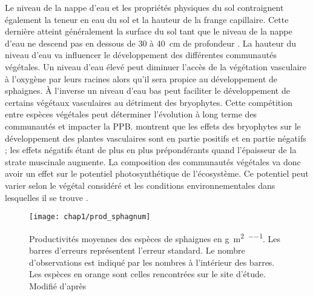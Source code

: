 Le niveau de la nappe d'eau et les propriétés physiques du sol contraignent également la teneur en eau du sol et la hauteur de la frange capillaire.
Cette dernière atteint généralement la surface du sol tant que le niveau de la nappe d'eau ne descend pas en dessous de \num{30} à \SI{40}{\centi\metre} de profondeur \citep{laiho2006}.
La hauteur du niveau d'eau va influencer le développement des différentes communautés végétales.
Un niveau d'eau élevé peut diminuer l'accès de la végétation vasculaire à l'oxygène par leurs racines alors qu'il sera propice au développement de sphaignes.
À l'inverse un niveau d'eau bas peut faciliter le développement de certains végétaux vasculaires au détriment des bryophytes.
Cette compétition entre espèces végétales peut déterminer l'évolution à long terme des communautés et impacter la PPB.
\citet{gornall2011} montrent que les effets des bryophytes sur le développement des plantes vasculaires sont en partie positifs et en partie négatifs ; les effets négatifs étant de plus en plus prépondérants quand l'épaisseur de la strate muscinale augmente.
La composition des communautés végétales va donc avoir un effet sur le potentiel photosynthétique de l'écosystème.
Ce potentiel peut varier selon le végétal considéré et les conditions environnementales dans lesquelles il se trouve \citep{moore2002}.

\begin{figure}
\centering
\texttt{[image: chap1/prod\_sphagnum]}
\caption{Productivités moyennes des espèces de sphaignes en \si{\gram\per\square\metre\per\year}. Les barres d'erreurs représentent l'erreur standard. Le nombre d'observations est indiqué par les nombres à l'intérieur des barres. Les espèces en orange sont celles rencontrées sur le site d'étude. Modifié d'après \citet{gunnarsson2005}}
\label{fig:prod_sphagnum}
\end{figure}

